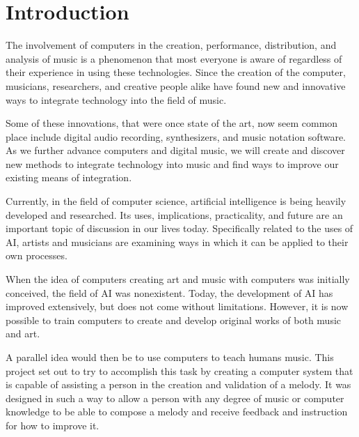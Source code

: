 \chapter{Introduction}
\label{ch:introduction}

The involvement of computers in the creation, performance, distribution, and analysis of music is a phenomenon that most everyone is aware of regardless of their experience in using these technologies.  Since the creation of the computer, musicians, researchers, and creative people alike have found new and innovative ways to integrate technology into the field of music.

\vspace{\baselineskip}

Some of these innovations, that were once state of the art, now seem common place include digital audio recording, synthesizers, and music notation software.  As we further advance computers and digital music, we will create and discover new methods to integrate technology into music and find ways to improve our existing means of integration.

\vspace{\baselineskip}

Currently, in the field of computer science, artificial intelligence is being heavily developed and researched.  Its uses, implications, practicality, and future are an important topic of discussion in our lives today.  Specifically related to the uses of AI, artists and musicians are examining ways in which it can be applied to their own processes.

\vspace{\baselineskip}

When the idea of computers creating art and music with computers was initially conceived, the field of AI was nonexistent.  Today, the development of AI has improved extensively, but does not come without limitations.  However, it is now possible to train computers to create and develop original works of both music and art.

\vspace{\baselineskip}

A parallel idea would then be to use computers to teach humans music.  This project set out to try to accomplish this task by creating a computer system that is capable of assisting a person in the creation and validation of a melody.  It was designed in such a way to allow a person with any degree of music or computer knowledge to be able to compose a melody and receive feedback and instruction for how to improve it.

